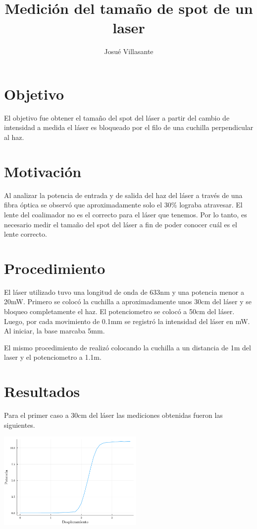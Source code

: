 \documentclass[twocolumn]{article}
\author{Josué Villasante}
\title{Medición del tamaño de spot de un laser}
\begin{document}
	\maketitle

	\section{Objetivo}
		El objetivo fue obtener el tamaño del spot del láser a partir del cambio de intensidad a medida el láser es bloqueado por el filo de una cuchilla perpendicular al haz.
	
	\section{Motivación}
		Al analizar la potencia de entrada y de salida del haz del láser a través de una fibra óptica se observó que aproximadamente solo el 30\% lograba atravesar. El lente del coalimador no es el correcto para el láser que tenemos. Por lo tanto, es necesario medir el tamaño del spot del láser a fin de poder conocer cuál es el lente correcto.
	
	\section{Procedimiento}
		El láser utilizado tuvo una longitud de onda de 633nm y una potencia menor a 20mW. Primero se colocó la cuchilla a aproximadamente unos 30cm del láser y se bloqueo completamente el haz. El potenciometro se colocó a 50cm del láser. Luego, por cada movimiento de 0.1mm se registró la intensidad del láser en mW. Al iniciar, la base marcaba 5mm.

		El mismo procedimiento de realizó colocando la cuchilla a un distancia de 1m del laser y el potenciometro a 1.1m.

	\section{Resultados}
		Para el primer caso a 30cm del láser las mediciones obtenidas fueron las siguientes.

		\begin{center}
			\includegraphics[width=200pt]{img/measurement_1.pdf}
		\end{center}
\end{document}

